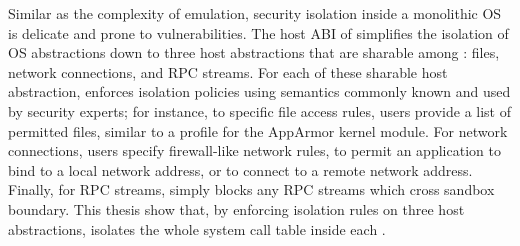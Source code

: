 




Similar as the complexity of emulation,
security isolation inside a monolithic OS is delicate and prone to vulnerabilities.
The host ABI of \graphene{} simplifies
the isolation of OS abstractions
down to three host abstractions that are sharable among \picoprocs{}: files, network connections, and RPC streams.
For each of these sharable host abstraction, \graphene{} enforces isolation policies using semantics
commonly known and used by security experts;
for instance, to specific file access rules, users provide a list of permitted files, similar to a profile for the AppArmor kernel module.
For network connections,
users specify firewall-like network rules,
to permit an application
to bind to a local network address, or to connect to a remote network address.
Finally, for RPC streams,
\graphene{} simply blocks any RPC streams
which cross sandbox boundary.
This thesis show that,
by enforcing isolation rules on three host abstractions,
\thehostabi{} isolates the whole system call table inside each \picoproc{}.



